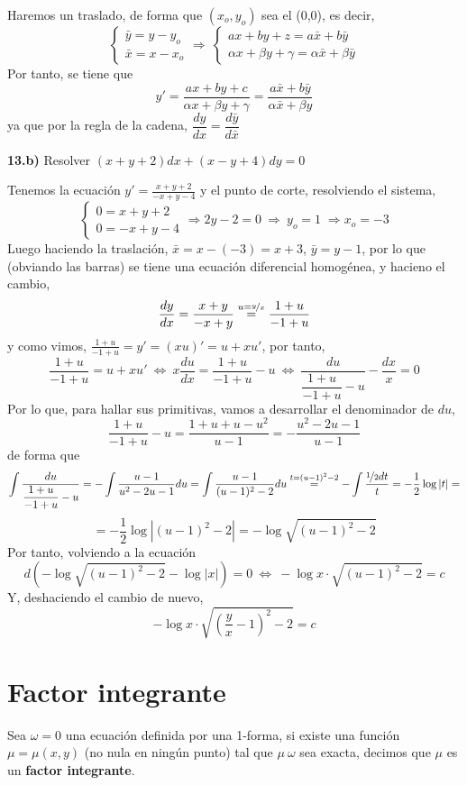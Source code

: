 Haremos un traslado, de forma que $(x_o,y_o)$ sea el (0,0), es decir, 
$$\left\{ \begin{array}{l}
     \bar{y}=y-y_o  \\
     \bar{x}=x-x_o 
\end{array}\right. \Rightarrow \: \left\{ \begin{array}{l}
     ax+by+z=a\bar{x}+b\bar{y}  \\
     {\alpha x+\beta y +\gamma}=\alpha\bar{x}+\beta\bar{y} 
\end{array}\right.$$
Por tanto, se tiene que $$y'=\dfrac{ax+by+c}{\alpha x+\beta y +\gamma}=\dfrac{a\bar{x}+b\bar{y}}{\alpha \bar{x}+\beta {y} }$$
ya que por la regla de la cadena, $\dfrac{dy}{dx}=\dfrac{d\bar{y}}{d\bar{x}}$
\begin{ejer}
    \textbf{13.b)} Resolver $(x+y+2)dx+(x-y+4)dy=0$
\end{ejer}
\begin{sol}
    Tenemos la ecuación $y'=\frac{x+y+2}{-x+y-4}$ y el punto de corte, resolviendo el sistema,
    $$\left\{ \begin{array}{l}
         0=x+y+2  \\
         0=-x+y-4 
    \end{array}\right. \Rightarrow 2y-2=0 \: \Rightarrow \: y_o=1 \; \Rightarrow x_o=-3$$
    Luego haciendo la traslación, $\bar{x}=x-(-3)=x+3$, $\bar{y}=y-1$, por lo que (obviando las barras) se tiene una ecuación diferencial homogénea, y hacieno el cambio,
    $$\dfrac{dy}{dx}=\dfrac{x+y}{-x+y}\overset{u=\nicefrac{y}{x}}{=}\dfrac{1+u}{-1+u}$$
    y como vimos, $\frac{1+u}{-1+u}=y'=(xu)'=u+xu'$, por tanto, 
    $$\dfrac{1+u}{-1+u}=u+xu' \:\iff \: x\dfrac{du}{dx}=\dfrac{1+u}{-1+u}-u \: \iff \: \dfrac{du}{\dfrac{1+u}{-1+u}-u}-\dfrac{dx}{x}=0$$
    Por lo que, para hallar sus primitivas, vamos a desarrollar el denominador de $du$, 
    $$\dfrac{1+u}{-1+u}-u=\dfrac{1+u+u-u^2}{u-1}=-\dfrac{u^2-2u-1}{u-1}$$
    de forma que 
    $$\int \dfrac{du}{\dfrac{1+u}{-1+u}-u}=-\int \dfrac{u-1}{u^2-2u-1}du=\int \dfrac{u-1}{(u-1)^2-2}du\overset{t=(u-1)^2-2}{=} -\int \dfrac{\nicefrac{1}{2}dt}{t}=-\dfrac{1}{2}\log|t|=$$ $$=-\dfrac{1}{2}\log|(u-1)^2-2|=-\log \sqrt{(u-1)^2-2}$$
    Por tanto, volviendo a la ecuación
    $$d\left(-\log \sqrt{(u-1)^2-2} - \log|x| \right)=0 \: \iff \: -\log x\cdot \sqrt{(u-1)^2-2}=c$$
    Y, deshaciendo el cambio de nuevo, 
    $$-\log x\cdot \sqrt{\left(\dfrac{y}{x}-1\right)^2-2}=c$$
\end{sol}
\section{Factor integrante}
Sea $\omega=0$ una ecuación definida por una 1-forma, si existe una función $\mu=\mu(x,y)$ (no nula en ningún punto) tal que $\mu \: \omega $ sea exacta, decimos que $\mu$ es un \textbf{factor integrante}. 

